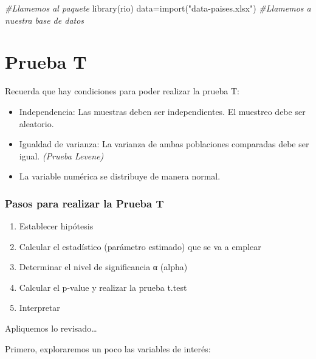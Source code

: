 \documentclass[
]{article}
\newenvironment{Shaded}{\begin{snugshade}}{\end{snugshade}}
\newcommand{\CommentTok}[1]{\textcolor[rgb]{0.56,0.35,0.01}{\textit{#1}}}
\newcommand{\FunctionTok}[1]{\textcolor[rgb]{0.00,0.00,0.00}{#1}}
\newcommand{\NormalTok}[1]{#1}
\newcommand{\OtherTok}[1]{\textcolor[rgb]{0.56,0.35,0.01}{#1}}
\newcommand{\StringTok}[1]{\textcolor[rgb]{0.31,0.60,0.02}{#1}}
\providecommand{\tightlist}{%
  \setlength{\itemsep}{0pt}\setlength{\parskip}{0pt}}
\begin{document}
\begin{Shaded}
\begin{Highlighting}[]
\CommentTok{\#Llamemos al paquete}
\FunctionTok{library}\NormalTok{(rio)}
\NormalTok{data}\OtherTok{=}\FunctionTok{import}\NormalTok{(}\StringTok{"data{-}paises.xlsx"}\NormalTok{)}
\CommentTok{\#Llamemos a nuestra base de datos}
\end{Highlighting}
\end{Shaded}

\hypertarget{prueba-t}{%
\section{\texorpdfstring{\textbf{Prueba T}}{Prueba T}}\label{prueba-t}}

Recuerda que hay condiciones para poder realizar la prueba T:

\begin{itemize}
\item
  Independencia: Las muestras deben ser independientes. El muestreo debe
  ser aleatorio.
\item
  Igualdad de varianza: La varianza de ambas poblaciones comparadas debe
  ser igual. \emph{(Prueba Levene)}
\item
  La variable numérica se distribuye de manera normal.
\end{itemize}

\hypertarget{pasos-para-realizar-la-prueba-t}{%
\subsubsection{\texorpdfstring{\textbf{Pasos para realizar la Prueba
T}}{Pasos para realizar la Prueba T}}\label{pasos-para-realizar-la-prueba-t}}

\begin{enumerate}
\def\labelenumi{\arabic{enumi}.}
\tightlist
\item
  Establecer hipótesis
\item
  Calcular el estadístico (parámetro estimado) que se va a emplear
\item
  Determinar el nivel de significancia α (alpha)
\item
  Calcular el p-value y realizar la prueba t.test
\item
  Interpretar
\end{enumerate}

Apliquemos lo revisado\ldots{}

Primero, exploraremos un poco las variables de interés:
\end{document}
